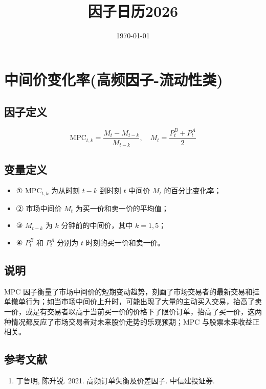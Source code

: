 \documentclass{article}
\title{因子日历2026}
\date{\today}
\begin{document}
\maketitle

\section{中间价变化率(高频因子-流动性类)}

\subsection{因子定义}
\begin{equation}
    \mathrm{MPC}_{t,k} = \frac{M_t - M_{t-k}}{M_{t-k}}, \quad M_t = \frac{P_t^B + P_t^A}{2}
\end{equation}

\subsection{变量定义}
\begin{itemize}
    \item ① \( \mathrm{MPC}_{t,k} \) 为从时刻 \( t-k \) 到时刻 \( t \) 中间价 \( M_t \) 的百分比变化率；
    \item ② 市场中间价 \( M_t \) 为买一价和卖一价的平均值；
    \item ③ \( M_{t-k} \) 为 \( k \) 分钟前的中间价，其中 \( k = 1, 5 \)；
    \item ④ \( P_t^B \) 和 \( P_t^A \) 分别为 \( t \) 时刻的买一价和卖一价。
\end{itemize}

\subsection{说明}
MPC 因子衡量了市场中间价的短期变动趋势，刻画了市场交易者的最新交易和挂单撤单行为；如当市场中间价上升时，可能出现了大量的主动买入交易，抬高了卖一价，或是有交易者以高于当前买一价的价格下了限价订单，抬高了买一价，这两种情况都反应了市场交易者对未来股价走势的乐观预期；MPC 与股票未来收益正相关。

\subsection{参考文献}
\begin{enumerate}
    \item 丁鲁明, 陈升锐. 2021. 高频订单失衡及价差因子. 中信建投证券.
\end{enumerate}
\end{document}
